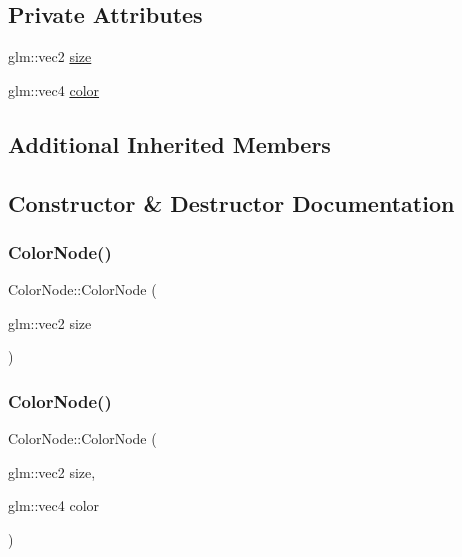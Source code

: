 \subsection*{Private Attributes}
\begin{DoxyCompactItemize}
\item 
glm\+::vec2 \mbox{\hyperlink{classsage_1_1ColorNode_a04b687374b9c171ff820c514f15b0ae0}{size}}
\item 
glm\+::vec4 \mbox{\hyperlink{classsage_1_1ColorNode_a5fc4ee3eac3b56392d7c46a8359ba97c}{color}}
\end{DoxyCompactItemize}
\subsection*{Additional Inherited Members}


\subsection{Constructor \& Destructor Documentation}
\mbox{\label{classsage_1_1ColorNode_a2a7235f477d542f28f6bbf1bda63176a}} 
\subsubsection{\texorpdfstring{ColorNode()}{ColorNode()}\hspace{0.1cm}{\footnotesize\ttfamily [1/2]}}
{\footnotesize\ttfamily Color\+Node\+::\+Color\+Node (\begin{DoxyParamCaption}\item[{glm\+::vec2}]{size }\end{DoxyParamCaption})}

\mbox{\label{classsage_1_1ColorNode_aa42072fabeb17cc9c3ccd4d769bd8644}} 
\subsubsection{\texorpdfstring{ColorNode()}{ColorNode()}\hspace{0.1cm}{\footnotesize\ttfamily [2/2]}}
{\footnotesize\ttfamily Color\+Node\+::\+Color\+Node (\begin{DoxyParamCaption}\item[{glm\+::vec2}]{size,  }\item[{glm\+::vec4}]{color }\end{DoxyParamCaption})}

